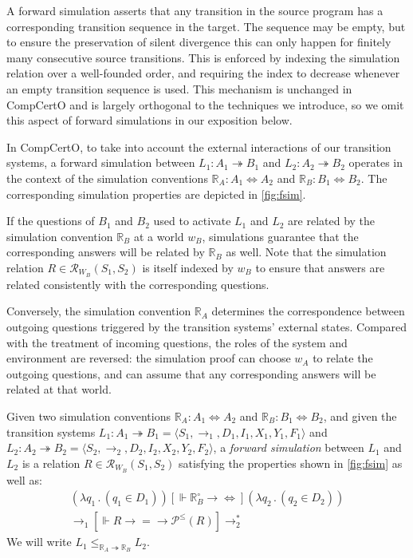 \documentclass[sigplan,10pt,review]{acmart}
\newcommand{\ifr}[1]{\mathrel{[{#1}]}}
\newcommand{\que}{\circ}
\begin{document}
A forward simulation asserts that any transition in the source program
has a corresponding transition sequence in the target.
The sequence may be empty,
but to ensure the preservation of silent divergence
this can only happen for finitely many consecutive source transitions.
This is enforced by indexing the simulation relation
over a well-founded order,
and requiring the index to decrease
whenever an empty transition sequence is used.
This mechanism is unchanged in CompCertO
and is largely orthogonal to the techniques we introduce,
so we omit this aspect of forward simulations
in our exposition below.

In CompCertO,
to take into account
the external interactions
of our transition systems,
a forward simulation between %
$L_1 : A_1 \twoheadrightarrow B_1$ and
$L_2 : A_2 \twoheadrightarrow B_2$
operates in the context of the simulation conventions
$\mathbb{R}_A : A_1 \Leftrightarrow A_2$ and
$\mathbb{R}_B : B_1 \Leftrightarrow B_2$.
The corresponding simulation properties
are depicted in \autoref{fig:fsim}.

If the questions of $B_1$ and $B_2$
used to activate $L_1$ and $L_2$
are related by the simulation convention $\mathbb{R}_B$
at a world $w_B$,
simulations guarantee that the corresponding answers will be related
by $\mathbb{R}_B$ as well.
Note that
the simulation relation $R \in \mathcal{R}_{W_B}(S_1, S_2)$
is itself indexed by $w_B$
to ensure that answers
are related consistently with the corresponding questions.

Conversely,
the simulation convention $\mathbb{R}_A$
determines the correspondence between
outgoing questions triggered by
the transition systems' external states.
Compared with the treatment of incoming questions,
the roles of the system and environment are reversed:
the simulation proof can choose $w_A$
to relate the outgoing questions,
and can assume that any corresponding answers
will be related at that world.

\begin{definition} \label{def:fsim} %
Given
two simulation conventions
$\mathbb{R}_A : A_1 \Leftrightarrow A_2$ and
$\mathbb{R}_B : B_1 \Leftrightarrow B_2$,
and given
the transition systems
$L_1 : A_1 \twoheadrightarrow B_1 = \langle S_1, {\rightarrow}_1, D_1, I_1, X_1, Y_1, F_1 \rangle$ and
$L_2 : A_2 \twoheadrightarrow B_2 = \langle S_2, {\rightarrow}_2, D_2, I_2, X_2, Y_2, F_2 \rangle$,
a \emph{forward simulation} between $L_1$ and $L_2$
is a relation
$R \in \mathcal{R}_{W_B}(S_1, S_2)$
satisfying the properties shown in
\autoref{fig:fsim}
as well as:
\begin{gather*}
  (\lambda q_1 \, . \, (q_1 \in D_1))
  \ifr{\Vdash \mathbb{R}_B^\que \rightarrow {\Leftrightarrow}}
  (\lambda q_2 \, . \, (q_2 \in D_2))
  \\
  {\rightarrow_1}
  \ifr{\Vdash R \rightarrow {=} \rightarrow \mathcal{P}^\le(R)}
  {\rightarrow_2^*}
\end{gather*}
We will write $L_1 \le_{\mathbb{R}_A \twoheadrightarrow \mathbb{R}_B} L_2$.
\end{definition}
\end{document}
